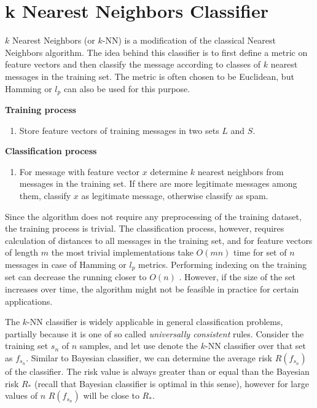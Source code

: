 \documentclass[12pt]{report}
\begin{document}
\newpage

\section{k Nearest Neighbors Classifier}

$k$ Nearest Neighbors (or $k$-NN) is a modification of the classical Nearest Neighbors algorithm. The idea behind this classifier is to first define a metric on feature vectors and then classify the message according to classes of $k$ nearest messages in the training set. The metric is often chosen to be Euclidean, but Hamming or $l_p$ can also be used for this purpose.

\textbf{Training process}

\begin{enumerate}
	\item Store feature vectors of training messages in two sets $L$ and $S$.
\end{enumerate}

\textbf{Classification process}

\begin{enumerate}
	\item For message with feature vector $x$ determine $k$ nearest neighbors from messages in the training set. If there are more legitimate messages among them, classify $x$ as legitimate message, otherwise classify as spam.
\end{enumerate}

Since the algorithm does not require any preprocessing of the training dataset, the training process is trivial. The classification process, however, requires calculation of distances to all messages in the training set, and for feature vectors of length $m$ the most trivial implementations take $O(mn)$ time for set of $n$ messages in case of Hamming or $l_p$ metrics. Performing indexing on the training set can decrease the running closer to $O(n)$ \cite{Tretyakov}. However, if the size of the set increases over time, the algorithm might not be feasible in practice for certain applications.

The $k$-NN classifier is widely applicable in general classification problems, partially because it is one of so called \textit{universally consistent} rules. Consider the training set $s_n$ of $n$ samples, and let use denote the $k$-NN classifier over that set as $f_{s_n}$. Similar to Bayesian classifier, we can determine the average risk $R(f_{s_n})$ of the classifier. The risk value is always greater than or equal than the Bayesian risk $R_*$ (recall that Bayesian classifier is optimal in this sense), however for large values of $n$ $R(f_{s_n})$ will be close to $R_*$.
\end{document}
